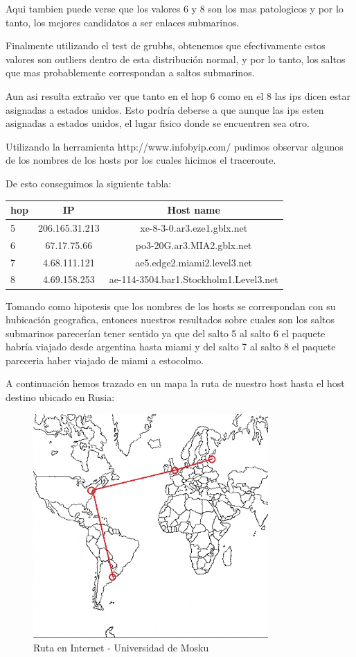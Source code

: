 Aqui tambien puede verse que los valores 6 y 8 son los mas patologicos y por lo tanto, los mejores candidatos a ser enlaces submarinos.

Finalmente utilizando el test de grubbs, obtenemos que efectivamente estos valores son outliers dentro de esta distribución normal, y por lo tanto, los saltos que mas probablemente correspondan a saltos submarinos.

Aun asi resulta extraño ver que tanto en el hop 6 como en el 8 las ips dicen estar asignadas a estados unidos. Esto podría deberse a que aunque las ips esten asignadas a estados unidos, el lugar fisico donde se encuentren sea otro.

Utilizando la herramienta http://www.infobyip.com/ pudimos observar algunos de los nombres de los hosts por los cuales hicimos el traceroute.

De esto conseguimos la siguiente tabla:

\begin{tabular}{| l | c | c }
\hline 
hop & IP & Host name\\
\hline 
5  &  206.165.31.213  &  xe-8-3-0.ar3.eze1.gblx.net\\
\hline 
6  &  67.17.75.66  &   po3-20G.ar3.MIA2.gblx.net\\
\hline 
7  &  4.68.111.121  & ae5.edge2.miami2.level3.net\\
\hline 
8  &  4.69.158.253  & ae-114-3504.bar1.Stockholm1.Level3.net\\
\end{tabular}

Tomando como hipotesis que los nombres de los hosts se correspondan con su hubicación geografica, entonces nuestros resultados sobre 
cuales son los saltos submarinos parecerían tener sentido ya que del salto 5 al salto 6 el paquete habría viajado desde argentina hasta miami y 
del salto 7 al salto 8 el paquete pareceria haber viajado de miami a estocolmo.

A continuación hemos trazado en un mapa la ruta de nuestro host hasta el host destino ubicado en Rusia:
\begin{figure}[H]
\centering
\includegraphics[width=0.8\textwidth]{graficos/mapa_rusia.jpg}
\caption{Ruta en Internet - Universidad de Mosku}
\label{rusia_zs}
\end{figure}
